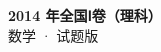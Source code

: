 \documentclass[zihao=-4, a4paper]{ctexart}
\begin{document}
\begin{center}
  {\Large\bfseries 2014 年全国Ⅰ卷（理科）}\\[4pt]
  {\large 数学 · 试题版}
\end{center}
\medskip
{}

\end{document}
